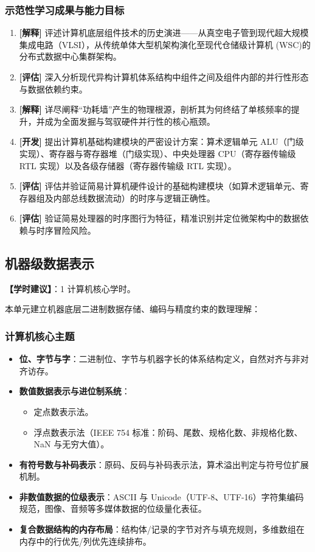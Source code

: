 \subsubsection{示范性学习成果与能力目标}
\begin{enumerate}
    \item \textbf{[解释]} 评述计算机底层组件技术的历史演进——从真空电子管到现代超大规模集成电路（VLSI），从传统单体大型机架构演化至现代仓储级计算机 (WSC)的分布式数据中心集群架构。
    \item \textbf{[评估]} 深入分析现代异构计算机体系结构中组件之间及组件内部的并行性形态与数据依赖约束。
    \item \textbf{[解释]} 详尽阐释“功耗墙”产生的物理根源，剖析其为何终结了单核频率的提升，并成为全面发掘与驾驭硬件并行性的核心瓶颈。
    \item \textbf{[开发]} 提出计算机基础构建模块的严密设计方案：算术逻辑单元 ALU（门级实现）、寄存器与寄存器堆（门级实现）、中央处理器 CPU（寄存器传输级 RTL 实现）以及各级存储器（寄存器传输级 RTL 实现）。
    \item \textbf{[评估]} 评估并验证简易计算机硬件设计的基础构建模块（如算术逻辑单元、寄存器组及内部总线数据流动）的时序与逻辑正确性。
    \item \textbf{[评估]} 验证简易处理器的时序图行为特征，精准识别并定位微架构中的数据依赖与时序冒险风险。
\end{enumerate}

\subsection{机器级数据表示}
\textbf{【学时建议】}：1 计算机核心学时。

本单元建立机器底层二进制数据存储、编码与精度约束的数理理解：

\subsubsection{计算机核心主题}
\begin{itemize}
    \item \textbf{位、字节与字}：二进制位、字节与机器字长的体系结构定义，自然对齐与非对齐访存。
    \item \textbf{数值数据表示与进位制系统}：
    \begin{itemize}
        \item 定点数表示法。
        \item 浮点数表示法（IEEE 754 标准：阶码、尾数、规格化数、非规格化数、NaN 与无穷大值）。
    \end{itemize}
    \item \textbf{有符号数与补码表示}：原码、反码与补码表示法，算术溢出判定与符号位扩展机制。
    \item \textbf{非数值数据的位级表示}：ASCII 与 Unicode（UTF-8、UTF-16）字符集编码规范，图像、音频等多媒体数据的位级量化表征。
    \item \textbf{复合数据结构的内存布局}：结构体/记录的字节对齐与填充规则，多维数组在内存中的行优先/列优先连续排布。
\end{itemize}

